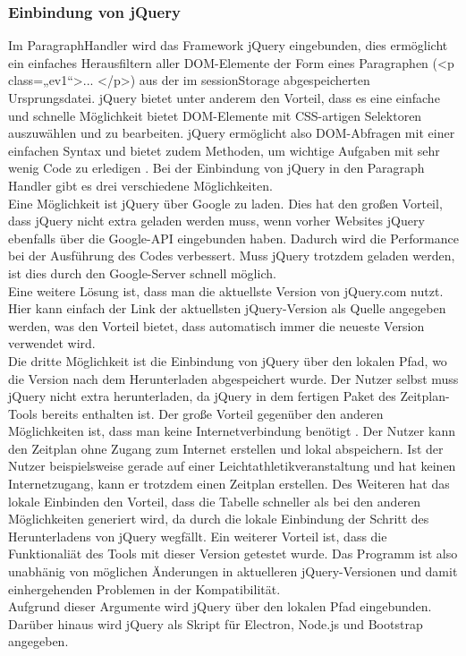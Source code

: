 \subsubsection{Einbindung von jQuery}
Im ParagraphHandler wird das Framework jQuery eingebunden, dies ermöglicht ein einfaches Herausfiltern aller DOM-Elemente der Form eines Paragraphen (<p class=„ev1“>... </p>) aus der im sessionStorage abgespeicherten Ursprungsdatei. jQuery bietet unter anderem den Vorteil, dass es eine einfache und schnelle Möglichkeit bietet DOM-Elemente mit CSS-artigen Selektoren auszuwählen und zu bearbeiten. jQuery ermöglicht also DOM-Abfragen mit einer einfachen Syntax und bietet zudem Methoden, um wichtige Aufgaben mit sehr wenig Code zu erledigen \cite[S. 294ff.]{duckett}. Bei der Einbindung von jQuery in den Paragraph Handler gibt es drei verschiedene Möglichkeiten.\\
Eine Möglichkeit ist jQuery über Google zu laden. Dies hat den großen Vorteil, dass jQuery nicht extra geladen werden muss, wenn vorher Websites jQuery ebenfalls über die Google-API eingebunden haben. Dadurch wird die Performance bei der Ausführung des Codes verbessert. Muss jQuery trotzdem geladen werden, ist dies durch den Google-Server schnell möglich. \\
Eine weitere Lösung ist, dass man die aktuellste Version von jQuery.com nutzt. Hier kann einfach der Link der aktuellsten jQuery-Version als Quelle angegeben werden, was den Vorteil bietet, dass automatisch immer die neueste Version verwendet wird. \\
Die dritte Möglichkeit ist die Einbindung von jQuery über den lokalen Pfad, wo die Version nach dem Herunterladen abgespeichert wurde. Der Nutzer selbst muss jQuery nicht extra herunterladen, da jQuery in dem fertigen Paket des Zeitplan-Tools bereits enthalten ist. Der große Vorteil gegenüber den anderen Möglichkeiten ist, dass man keine Internetverbindung benötigt \cite{jQuery}. Der Nutzer kann den Zeitplan ohne Zugang zum Internet erstellen und lokal abspeichern. Ist der Nutzer beispielsweise gerade auf einer Leichtathletikveranstaltung und hat keinen Internetzugang, kann er trotzdem einen Zeitplan erstellen. Des Weiteren hat das lokale Einbinden den Vorteil, dass die Tabelle schneller als bei den anderen Möglichkeiten generiert wird, da durch die lokale Einbindung der Schritt des Herunterladens von jQuery wegfällt. Ein weiterer Vorteil ist, dass die Funktionaliät des Tools mit dieser Version getestet wurde. Das Programm ist also unabhänig von möglichen Änderungen in aktuelleren jQuery-Versionen und damit einhergehenden Problemen in der Kompatibilität. \\
Aufgrund dieser Argumente wird jQuery über den lokalen Pfad eingebunden.  
Darüber hinaus wird jQuery als Skript für Electron, Node.js und Bootstrap angegeben. 

